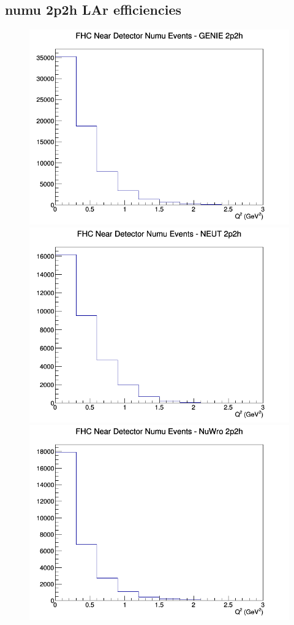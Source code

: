 \documentclass[12pt]{article}
\begin{document}
\subsection{numu 2p2h LAr efficiencies}
\begin{figure}[h]
\includegraphics[width=\linewidth]{eff_Q2/LAr/2p2h_FHC_ND_numu_Q2_GENIE.png}
\endminipage
{}
\includegraphics[width=\linewidth]{eff_Q2/LAr/2p2h_FHC_ND_numu_Q2_NEUT.png}
\endminipage
{}
\includegraphics[width=\linewidth]{eff_Q2/LAr/2p2h_FHC_ND_numu_Q2_NuWro.png}

\end{figure}
\end{document}
